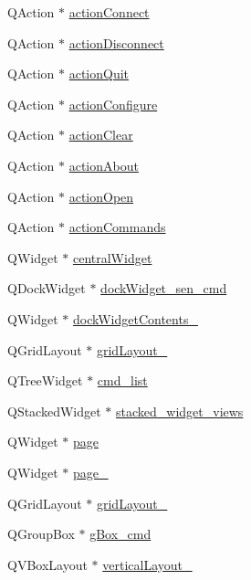 \begin{DoxyCompactItemize}
\item 
Q\+Action $\ast$ \hyperlink{a00027_aa0785566311fc48271690fb68b1d4c5f}{action\+Connect}
\item 
Q\+Action $\ast$ \hyperlink{a00027_a8a16b3aef75b279eaaa887152d2f746b}{action\+Disconnect}
\item 
Q\+Action $\ast$ \hyperlink{a00027_a188c243f36a2dbc10e4e2a0ad94273b1}{action\+Quit}
\item 
Q\+Action $\ast$ \hyperlink{a00027_a3860abde3cfd3f6170e28fddde73f11e}{action\+Configure}
\item 
Q\+Action $\ast$ \hyperlink{a00027_ac8539dcd87955047877cb256aff60453}{action\+Clear}
\item 
Q\+Action $\ast$ \hyperlink{a00027_abdf2b43167c2cd0d3405f90b8c30e934}{action\+About}
\item 
Q\+Action $\ast$ \hyperlink{a00027_a5772f39001f62b7f601aafe72caa10c0}{action\+Open}
\item 
Q\+Action $\ast$ \hyperlink{a00027_a3dccdc21d3df68b86550093b5e3c0356}{action\+Commands}
\item 
Q\+Widget $\ast$ \hyperlink{a00027_a30075506c2116c3ed4ff25e07ae75f81}{central\+Widget}
\item 
Q\+Dock\+Widget $\ast$ \hyperlink{a00027_a9eb86a5ee396766f0f4a65f2d2bd7688}{dock\+Widget\+\_\+sen\+\_\+cmd}
\item 
Q\+Widget $\ast$ \hyperlink{a00027_a23b450a9debad2b0fecc6f063772caf2}{dock\+Widget\+Contents\+\_}
\item 
Q\+Grid\+Layout $\ast$ \hyperlink{a00027_a6b2a0c5f7e8ff2a87134908dd770d2d2}{grid\+Layout\+\_}
\item 
Q\+Tree\+Widget $\ast$ \hyperlink{a00027_aa66ece71395b435e915d384fb63bac1d}{cmd\+\_\+list}
\item 
Q\+Stacked\+Widget $\ast$ \hyperlink{a00027_a59e39bd3d716004e840a5be5dda18b96}{stacked\+\_\+widget\+\_\+views}
\item 
Q\+Widget $\ast$ \hyperlink{a00027_ad7d164376bef8649ee1f94697b859417}{page}
\item 
Q\+Widget $\ast$ \hyperlink{a00027_adcb6de4cebc6760fe319711f125010cc}{page\+\_}
\item 
Q\+Grid\+Layout $\ast$ \hyperlink{a00027_a8ee86315639f324b17708efc7dbe8b19}{grid\+Layout\+\_}
\item 
Q\+Group\+Box $\ast$ \hyperlink{a00027_ad5c6667239e28060ba3b04ee0db97bac}{g\+Box\+\_\+cmd}
\item 
Q\+V\+Box\+Layout $\ast$ \hyperlink{a00027_a93c190b085c63a667c535ba0bbcfec7c}{vertical\+Layout\+\_}

\end{DoxyCompactItemize}
